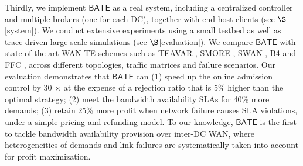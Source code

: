 \documentclass[sigconf]{acmart}
\begin{document}
Thirdly, 
we implement $\mathsf{BATE}$ as a real system, including a centralized controller and multiple brokers (one for each DC),  together with end-host clients (see $\S$\ref{system}).
 We conduct extensive experiments using a small testbed as well as trace driven large scale simulations (see $\S$\ref{evaluation}).
We compare  $\mathsf{BATE}$ with state-of-the-art WAN TE schemes such as TEAVAR \cite{Teavar}, SMORE \cite{SMORE}, SWAN \cite{swan}, B4 \cite{B4} and FFC \cite{FFC}, across different topologies, traffic matrices and failure scenarios.
Our evaluation demonstrates that $\mathsf{BATE}$ can 
(1) speed up the online admission control by 30 $\times $ at the expense of a rejection ratio that is 5\% higher than the optimal strategy;
(2) meet the bandwidth availability SLAs for 40\% more demands;
(3) retain 25\% more profit when network failure causes SLA violations, under a simple pricing and refunding model. 
To our knowledge, $\mathsf{BATE}$ is the first to tackle bandwidth availability provision over inter-DC WAN, where heterogeneities of demands and link failures are systematically taken into account for profit maximization.  

%
\end{document}
